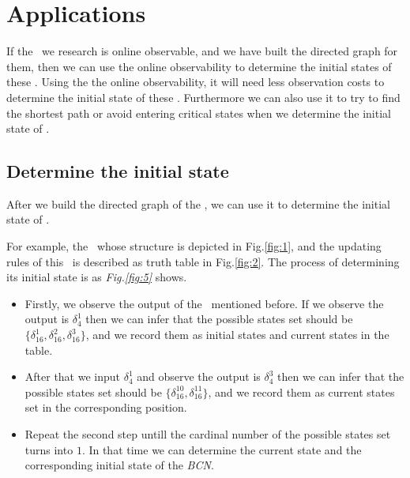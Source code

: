 \section{Applications}
\label{sec:app}
If the \BCNs\ we research is online observable, and we have built the directed graph for them, then we can use the online observability to determine the initial states of these \BCNs. Using the the online observability, it will need less observation costs to determine the initial state of these \BCNs. Furthermore we can also use it to try to find the shortest path or avoid entering critical states when we determine the initial state of \BCNs. %

\subsection{Determine the initial state}

After we build the directed graph of the \BCN, we can use it to determine the initial state of \BCNs.
\begin{example}
For example, the \BCN\ whose structure is depicted in Fig.\ref{fig:1}, and the updating rules of this \BCN\ is described as truth table in Fig.\ref{fig:2}. The process of determining its initial state is as {\em Fig.\ref{fig:5}} shows. 
\begin{itemize}
  \item Firstly, we observe the output of the \BCN\ mentioned before. If we observe the output is $\delta_4^1$ then we can infer that the possible states set should be $\{\delta_{16}^1,\delta_{16}^2,\delta_{16}^3\}$, and we record them as initial states and current states in the table. 
  \item After that we input  $\delta_4^1$ and observe the output is $\delta_4^3$ then we can infer that the possible states set should be $\{\delta_{16}^{10},\delta_{16}^{11}\}$, and we record them as current states set in the corresponding position. 
 \item Repeat the second step untill the cardinal number of the possible states set turns into $1$. In that time we can determine the current state and the corresponding initial state of the {\em BCN}.
\end{itemize} 
\end{example}   

